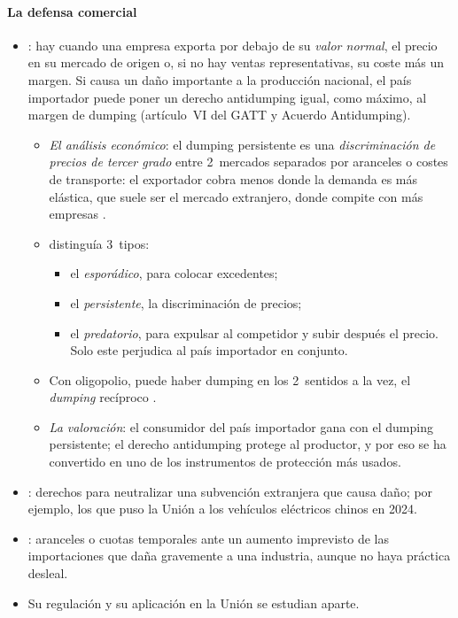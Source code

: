 \documentclass[11pt]{article}
\begin{document}
\paragraph{La defensa comercial}

\begin{itemize}
\item {}: hay  cuando una empresa exporta por debajo de su \emph{valor normal}, el precio en su mercado de origen o, si no hay ventas representativas, su coste más un margen. Si causa un daño importante a la producción nacional, el país importador puede poner un derecho antidumping igual, como máximo, al margen de dumping (artículo~VI del GATT y Acuerdo Antidumping)\nocite{OMC1994Antidumping}.
  \begin{itemize}
  \item \emph{El análisis económico}: el dumping persistente es una \emph{discriminación de precios de tercer grado} entre 2~mercados separados por aranceles o costes de transporte: el exportador cobra menos donde la demanda es más elástica, que suele ser el mercado extranjero, donde compite con más empresas .
  \item \textcite{Viner1923Dumping} distinguía 3~tipos:
    \begin{itemize}
    \item el \emph{esporádico}, para colocar excedentes;
    \item el \emph{persistente}, la discriminación de precios;
    \item el \emph{predatorio}, para expulsar al competidor y subir después el precio. Solo este perjudica al país importador en conjunto.
    \end{itemize}
  \item Con oligopolio, puede haber dumping en los 2~sentidos a la vez, el \emph{dumping} recíproco .
  \item \emph{La valoración}: el consumidor del país importador gana con el dumping persistente; el derecho antidumping protege al productor, y por eso se ha convertido en uno de los instrumentos de protección más usados.
  \end{itemize}
\item {}: derechos para neutralizar una subvención extranjera que causa daño\nocite{OMC1994SMC}; por ejemplo, los que puso la Unión a los vehículos eléctricos chinos en 2024\nocite{UE2024BEV}.
\item {}: aranceles o cuotas temporales ante un aumento imprevisto de las importaciones que daña gravemente a una industria, aunque no haya práctica desleal\nocite{OMC1994Salvaguardias}.
\item Su regulación  y su aplicación en la Unión  se estudian aparte.
\end{itemize}
\end{document}
